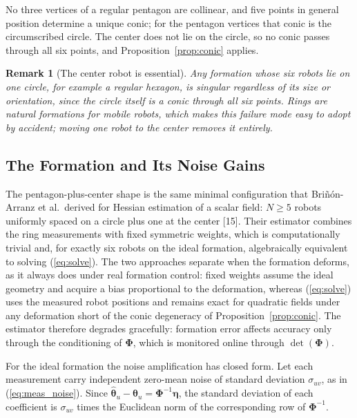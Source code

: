 \documentclass[lettersize,journal]{IEEEtran}
\newtheorem{remark}{Remark}
\begin{document}
\begin{IEEEproof}
No three vertices of a regular pentagon are collinear, and five points in
general position determine a unique conic; for the pentagon vertices that
conic is the circumscribed circle. The center does not lie on the
circle, so no conic passes through all six points, and
Proposition~\ref{prop:conic} applies.
\end{IEEEproof}

\begin{remark}[The center robot is essential]
Any formation whose six robots lie on one circle, for example a regular
hexagon, is singular regardless of its size or orientation, since the
circle itself is a conic through all six points. Rings are natural
formations for mobile robots, which makes this failure mode easy to adopt
by accident; moving one robot to the center removes it entirely.
\end{remark}

\subsection{The Formation and Its Noise Gains}
\label{sec:formation}

The pentagon-plus-center shape is the same minimal configuration that
Bri\~{n}\'{o}n-Arranz et al.\ derived for Hessian estimation of a scalar
field: $N \geq 5$ robots uniformly spaced on a circle plus one at the
center [15]. Their estimator combines the ring measurements with fixed
symmetric weights, which is computationally trivial and, for exactly six
robots on the ideal formation, algebraically equivalent to solving
(\ref{eq:solve}). The two approaches separate when the formation deforms,
as it always does under real formation control: fixed weights assume the
ideal geometry and acquire a bias proportional to the deformation,
whereas (\ref{eq:solve}) uses the measured robot positions and remains
exact for quadratic fields under any deformation short of the conic
degeneracy of Proposition~\ref{prop:conic}. The estimator therefore
degrades gracefully: formation error affects accuracy only through the
conditioning of $\boldsymbol{\Phi}$, which is monitored online through
$\det(\boldsymbol{\Phi})$.

For the ideal formation the noise amplification has closed form. Let each
measurement carry independent zero-mean noise of standard deviation
$\sigma_{uv}$, as in (\ref{eq:meas_noise}). Since
$\hat{\boldsymbol{\theta}}_u - \boldsymbol{\theta}_u =
\boldsymbol{\Phi}^{-1}\boldsymbol{\eta}$, the standard deviation of each
coefficient is $\sigma_{uv}$ times the Euclidean norm of the
corresponding row of $\boldsymbol{\Phi}^{-1}$.
\end{document}

